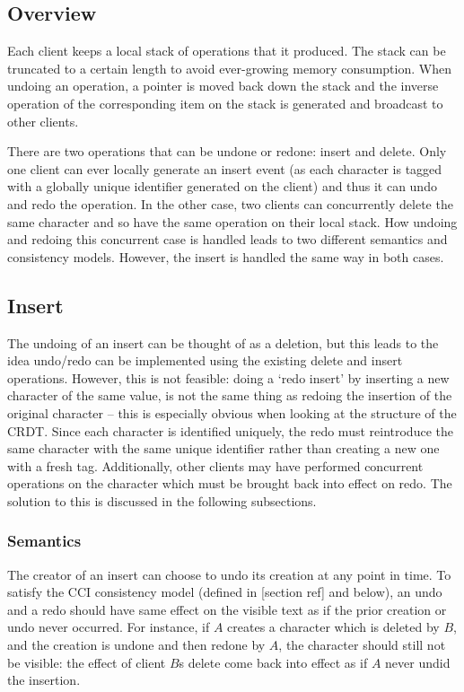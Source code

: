 \documentclass[12pt,a4paper,twoside,openright]{report}
\begin{document}
	\subsection{Overview}
	Each client keeps a local stack of operations that it produced. The stack can be truncated to a certain length to avoid ever-growing memory consumption. When undoing an operation, a pointer is moved back down the stack and the inverse operation of the corresponding item on the stack is generated and broadcast to other clients.
	
	There are two operations that can be undone or redone: insert and delete. Only one client can ever locally generate an insert event (as each character is tagged with a globally unique identifier generated on the client) and thus it can undo and redo the operation. In the other case, two clients can concurrently delete the same character and so have the same operation on their local stack. How undoing and redoing this concurrent case is handled leads to two different semantics and consistency models. However, the insert is handled the same way in both cases.
	
	
	\subsection{Insert}
	The undoing of an insert can be thought of as a deletion, but this leads to the idea undo/redo can be implemented using the existing delete and insert operations. However, this is not feasible: doing a `redo insert' by inserting a new character of the same value, is not the same thing as redoing the insertion of the original character -- this is especially obvious when looking at the structure of the CRDT. Since each character is identified uniquely, the redo must reintroduce the same character with the same unique identifier rather than creating a new one with a fresh tag. Additionally, other clients may have performed concurrent operations on the character which must be brought back into effect on redo. The solution to this is discussed in the following subsections.
	
		\subsubsection{Semantics}
		The creator of an insert can choose to undo its creation at any point in time. To satisfy the CCI consistency model (defined in [section ref] and below), an undo and a redo should have same effect on the visible text as if the prior creation or undo never occurred. For instance, if $A$ creates a character which is deleted by $B$, and the creation is undone and then redone by $A$, the character should still not be visible: the effect of client $B$s delete come back into effect as if $A$ never undid the insertion.
		
\end{document}
